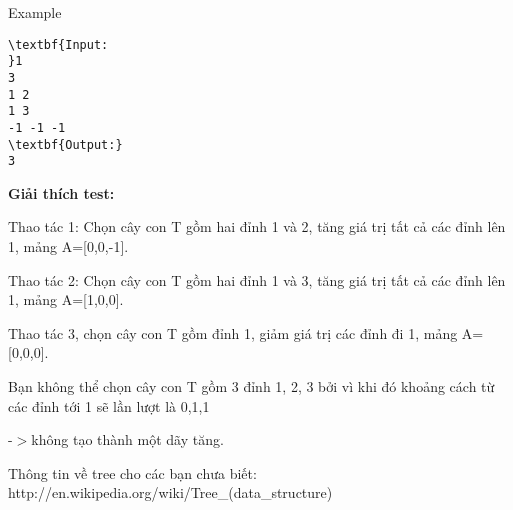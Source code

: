 Example
\begin{verbatim}
\textbf{Input:
}1
3
1 2
1 3
-1 -1 -1
\textbf{Output:}
3
\end{verbatim}

\textbf{Giải thích test:}

Thao tác 1: Chọn cây con T gồm hai đỉnh 1 và 2, tăng giá trị tất cả các đỉnh lên 1, mảng A=[0,0,-1].

Thao tác 2: Chọn cây con T gồm hai đỉnh 1 và 3, tăng giá trị tất cả các đỉnh lên 1, mảng A=[1,0,0].

Thao tác 3, chọn cây con T gồm đỉnh 1, giảm giá trị các đỉnh đi 1, mảng A=[0,0,0].

Bạn không thể chọn cây con T gồm 3 đỉnh 1, 2, 3 bởi vì khi đó khoảng cách từ các đỉnh tới 1 sẽ lần lượt là 0,1,1

-$>$không tạo thành một dãy tăng.

Thông tin về tree cho các bạn chưa biết: http://en.wikipedia.org/wiki/Tree\_(data\_structure)
